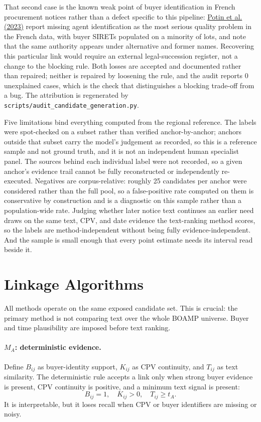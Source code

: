 \documentclass[11pt,a4paper]{article}
\begin{document}
That second case is the known weak point of buyer identification in French
procurement notices rather than a defect specific to this pipeline:
\href{https://doi.org/10.1038/s41597-023-02213-z}{Potin et al. (2023)} report
missing agent identification as the most serious quality problem in the French
data, with buyer SIRETs populated on a minority of lots, and note that the same
authority appears under alternative and former names. Recovering this particular
link would require an external legal-succession register, not a change to the
blocking rule. Both losses are accepted and documented rather than repaired;
neither is repaired by loosening the rule, and the audit reports
0 unexplained cases, which is the check that
distinguishes a blocking trade-off from a bug. The attribution is regenerated by
\texttt{scripts/audit\_candidate\_generation.py}.

Five limitations bind everything computed from the regional reference. The
labels were spot-checked on a subset rather than verified anchor-by-anchor;
anchors outside that subset carry the model's judgement as recorded, so this is a
reference sample and not ground truth, and it is not an independent human
specialist panel. The sources behind each individual label were not recorded, so
a given anchor's evidence trail cannot be fully reconstructed or independently
re-executed. Negatives are corpus-relative: roughly 25 candidates per anchor were
considered rather than the full pool, so a false-positive rate computed on them
is conservative by construction and is a diagnostic on this sample rather than a
population-wide rate. Judging whether later notice text continues an earlier need
draws on the same text, CPV, and date evidence the text-ranking method scores, so
the labels are method-independent without being fully evidence-independent. And
the sample is small enough that every point estimate needs its interval read
beside it.

\section{Linkage Algorithms}
All methods operate on the same exposed candidate set. This is crucial: the
primary method is not comparing text over the whole BOAMP universe. Buyer and
time plausibility are imposed before text ranking.

\paragraph{\(M_A\): deterministic evidence.}
Define \(B_{ij}\) as buyer-identity support, \(K_{ij}\) as CPV continuity, and
\(T_{ij}\) as text similarity. The deterministic rule accepts a link only when
strong buyer evidence is present, CPV continuity is positive, and a minimum text
signal is present:
\[
B_{ij}=1,\quad K_{ij}>0,\quad T_{ij}\geq t_A .
\]
It is interpretable, but it loses recall when CPV or buyer identifiers are
missing or noisy.
\end{document}
